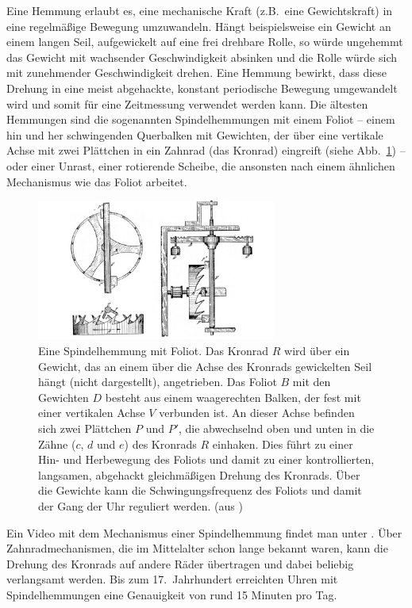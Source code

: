 Eine Hemmung 
erlaubt es, eine mechanische Kraft (z.B.\ eine Gewichtskraft) in eine regelm\"a\ss ige Bewegung
umzuwandeln. H\"angt beispielsweise ein Gewicht an einem langen Seil, aufgewickelt auf eine
frei drehbare Rolle, so w\"urde ungehemmt das Gewicht mit wachsender Geschwindigkeit
absinken und die Rolle w\"urde sich mit zunehmender Geschwindigkeit drehen. Eine Hemmung
bewirkt, dass diese Drehung in eine meist abgehackte, konstant periodische Bewegung umgewandelt wird
und somit f\"ur eine Zeitmessung verwendet werden kann. Die \"altesten Hemmungen sind die
sogenannten Spindelhemmungen 
mit einem Foliot -- einem hin und her schwingenden Querbalken mit Gewichten, 
der \"uber eine vertikale Achse mit zwei Pl\"attchen in ein Zahnrad 
(das Kronrad) eingreift (siehe Abb.\ \ref{fig_Foliot}) -- oder
einer Unrast, einer rotierende Scheibe, die ansonsten nach einem 
\"ahnlichen Mechanismus wie das Foliot arbeitet.

\begin{figure}[htb]
\includegraphics[width=0.7\textwidth]{./Bilder/Foliot.jpg}
\caption{\label{fig_Foliot}%
Eine Spindelhemmung mit Foliot. Das Kronrad $R$ wird \"uber ein Gewicht, das an einem \"uber die
Achse des Kronrads gewickelten Seil h\"angt (nicht dargestellt), angetrieben. Das Foliot $B$ mit den Gewichten $D$
besteht aus einem waagerechten Balken, der fest mit einer vertikalen Achse $V$ verbunden ist. 
An dieser Achse befinden sich zwei Pl\"attchen $P$ und $P'$, die abwechselnd oben und unten in die
Z\"ahne ($c$, $d$ und $e$) des Kronrads $R$ einhaken. 
Dies f\"uhrt zu einer Hin- und Herbewegung des Foliots und damit
zu einer kontrollierten, langsamen, abgehackt gleichm\"a\ss igen Drehung des Kronrads. \"Uber die Gewichte kann
die Schwingungsfrequenz des Foliots und damit der Gang der Uhr reguliert werden.
(aus \cite{Foliot})}
\end{figure}
 
 Ein Video mit dem Mechanismus einer Spindelhemmung findet man unter \cite{Verge}. 
 \"Uber Zahnradmechanismen, die im Mittelalter schon lange bekannt waren, 
 kann die Drehung des Kronrads auf andere R\"ader \"ubertragen und
 dabei beliebig verlangsamt werden. Bis zum 17.\ Jahrhundert erreichten Uhren mit Spindelhemmungen eine
 Genauigkeit von rund 15 Minuten pro Tag. 
 
